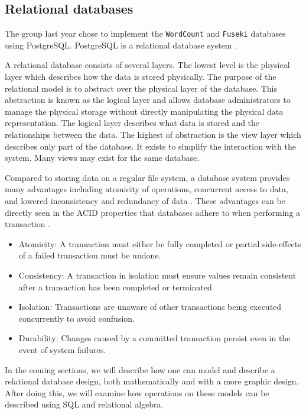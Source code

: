 \subsection{Relational databases}
The group last year chose to implement the \texttt{WordCount} and \texttt{Fuseki} databases using PostgreSQL.
PostgreSQL is a relational database system \cite{knox2020}.


A relational database consists of several layers.
The lowest level is the physical layer which describes how the data is stored physically.
The purpose of the relational model is to abstract over the physical layer of the database.
This abstraction is known as the logical layer and allows database administrators to manage the physical storage without directly manipulating the physical data representation.
The logical layer describes what data is stored and the relationships between the data.
The highest of abstraction is the view layer which describes only part of the database. It exists to simplify the interaction with the system. Many views may exist for the same database.
\cite[Chapter 1.3]{DBSBook}

Compared to storing data on a regular file system, a database system provides many advantages including atomicity of operations, concurrent access to data, and lowered inconsistency and redundancy of data \cite[Chapter 1.2]{DBSBook}.
These advantages can be directly seen in the ACID properties that databases adhere to when performing a transaction \cite[Chapter~17]{DBSBook}.
\begin{itemize} \label{ACID}
    \item Atomicity: A transaction must either be fully completed or partial side-effects of a failed transaction must be undone.
    \item Consistency: A transaction in isolation must ensure values remain consistent after a transaction has been completed or terminated.
    \item Isolation: Transactions are unaware of other transactions being executed concurrently to avoid confusion.
    \item Durability: Changes caused by a committed transaction persist even in the event of system failures.
\end{itemize}

In the coming sections, we will describe how one can model and describe a relational database design, both mathematically and with a more graphic design.
After doing this, we will examine how operations on these models can be described using SQL and relational algebra.

